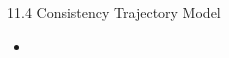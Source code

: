 \begin{frame}{11.4 Consistency Trajectory Model}
    \begin{itemize}
        \item
    \end{itemize}
\end{frame}
